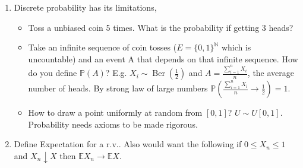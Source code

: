     \begin{enumerate}
        \item Discrete probability has its limitations,
        \begin{itemize}
            \item Toss a unbiased coin 5 times. What is the probability if getting 3 heads?
            \item Take an infinite sequence of coin tosses ($E = \{0, 1\}^\mathbb{N}$ which is uncountable) and an event A that depends on that infinite sequence. How do you define $\mathbb{P}(A)$?
            E.g. $X_i \sim \operatorname{Ber}\left( \frac{1}{2} \right)$ and $A = \frac{\sum_{i=1}^{n} X_i}{n}$, the average number of heads.
            By strong law of large numbers $\mathbb{P}\left( \frac{\sum_{i=1}^{n} X_i}{n} \to \frac{1}{2} \right) = 1$.
            \item How to draw a point uniformly at random from $[0, 1]$? $U \sim U[0, 1]$.
            Probability needs axioms to be made rigorous.
        \end{itemize}
        \item Define Expectation for a r.v.. Also would want the following if $0 \leq X_n \leq 1$ and $X_n \downarrow X$ then $\mathbb{E} X_n \to \mathbb{E} X$.
    \end{enumerate}

    
